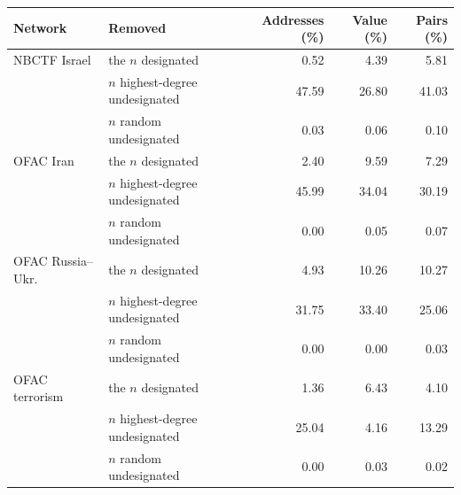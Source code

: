 \caption{\textbf{Removal effects weighted by value as well as by address count.} The component-share measure used elsewhere counts addresses, so it reports how many accounts lose their only route rather than how much value does. Here the same removals are scored three ways: the share of retained addresses in the largest weakly connected component, the share of transferred USDT on pairs whose endpoints both survive and remain in it, and the share of such pairs. Values are percentage losses relative to the intact network. Weighting by value narrows the gap between designated addresses and undesignated hubs everywhere and reverses it in the counter-terrorism network. These are crawled two-hop networks, in which no structural quantity is identified (Supplementary Table~\ref{tab:boundary}); they are given so that the measure's behaviour can be seen.}
\label{tab:flow-weighted}
\small
\begin{tabular}{llrrr}
\toprule
Network & Removed & Addresses (\%) & Value (\%) & Pairs (\%) \\
\midrule
NBCTF Israel & the $n$ designated & 0.52 & 4.39 & 5.81 \\
 & $n$ highest-degree undesignated & 47.59 & 26.80 & 41.03 \\
 & $n$ random undesignated & 0.03 & 0.06 & 0.10 \\
\addlinespace
OFAC Iran & the $n$ designated & 2.40 & 9.59 & 7.29 \\
 & $n$ highest-degree undesignated & 45.99 & 34.04 & 30.19 \\
 & $n$ random undesignated & 0.00 & 0.05 & 0.07 \\
\addlinespace
OFAC Russia--Ukr. & the $n$ designated & 4.93 & 10.26 & 10.27 \\
 & $n$ highest-degree undesignated & 31.75 & 33.40 & 25.06 \\
 & $n$ random undesignated & 0.00 & 0.00 & 0.03 \\
\addlinespace
OFAC terrorism & the $n$ designated & 1.36 & 6.43 & 4.10 \\
 & $n$ highest-degree undesignated & 25.04 & 4.16 & 13.29 \\
 & $n$ random undesignated & 0.00 & 0.03 & 0.02 \\
\bottomrule
\end{tabular}
